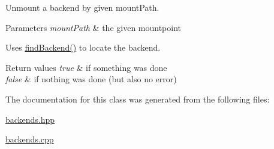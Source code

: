 Unmount a backend by given mount\+Path. 


\begin{DoxyParams}{Parameters}
{\em mount\+Path} & the given mountpoint\\
\hline
\end{DoxyParams}
Uses \hyperlink{classkdb_1_1tools_1_1Backends_a692f3f6b5f01ed2e497a6e093e1e2e90}{find\+Backend()} to locate the backend.


\begin{DoxyRetVals}{Return values}
{\em true} & if something was done \\
\hline
{\em false} & if nothing was done (but also no error) \\
\hline
\end{DoxyRetVals}


The documentation for this class was generated from the following files\+:\begin{DoxyCompactItemize}
\item 
\hyperlink{backends_8hpp}{backends.\+hpp}\item 
\hyperlink{backends_8cpp}{backends.\+cpp}\end{DoxyCompactItemize}
